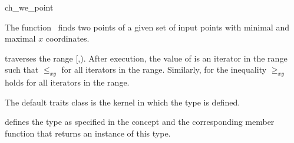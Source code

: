 

\begin{ccRefFunction}{ch_we_point}  %

\ccDefinition
  
The function \ccRefName\ finds two points of a given set  
of input points with minimal and maximal $x$ coordinates.


           {traverses the range [,).
            After execution, the value of
             is an iterator in the range such that  $\le_{xy}$
             for all iterators  in the range. Similarly, for
             the inequality  $\ge_{xy}$ 
            holds for all iterators in the range.}


The default traits class  is the kernel in which the
type  is defined.

 defines the type  as specified in
the concept  and the corresponding member
function that returns an instance of this type.


\ccSeeAlso

 \\
 \\
 \\
 \\
 \\
 \\

\end{ccRefFunction}


